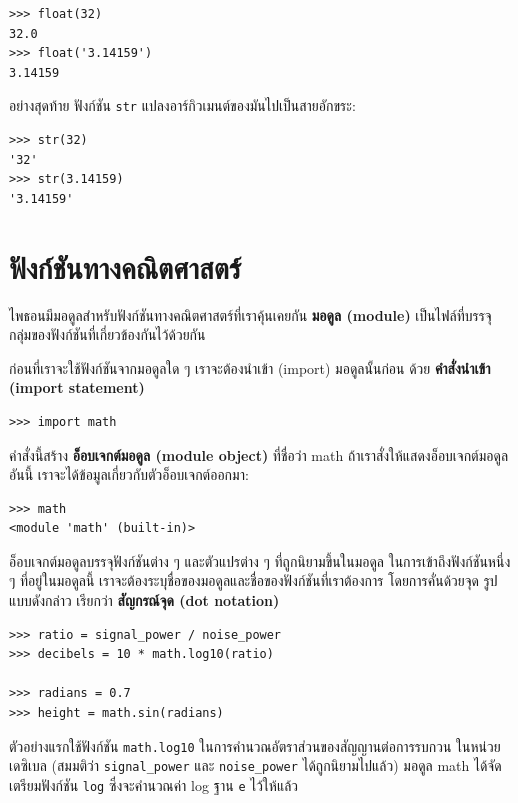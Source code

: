 \begin{verbatim}
>>> float(32)
32.0
>>> float('3.14159')
3.14159
\end{verbatim}
%
อย่างสุดท้าย ฟังก์ชัน {\tt str} แปลงอาร์กิวเมนต์ของมันไปเป็นสายอักขระ:

\begin{verbatim}
>>> str(32)
'32'
>>> str(3.14159)
'3.14159'
\end{verbatim}
%


\section{ฟังก์ชันทางคณิตศาสตร์} %

ไพธอนมีมอดูลสำหรับฟังก์ชันทางคณิตศาสตร์ที่เราคุ้นเคยกัน  {\bf มอดูล (module)} 
เป็นไฟล์ที่บรรจุกลุ่มของฟังก์ชันที่เกี่ยวข้องกันไว้ด้วยกัน

ก่อนที่เราจะใช้ฟังก์ชันจากมอดูลใด ๆ เราจะต้องนำเข้า (import) มอดูลนั้นก่อน ด้วย 
{\bf คำสั่งนำเข้า (import statement)}


\begin{verbatim}
>>> import math
\end{verbatim}
%
คำสั่งนี้สร้าง {\bf อ็อบเจกต์มอดูล (module object)} ที่ชื่อว่า math 
ถ้าเราสั่งให้แสดงอ็อบเจกต์มอดูลอันนี้ เราจะได้ข้อมูลเกี่ยวกับตัวอ็อบเจกต์ออกมา:

\begin{verbatim}
>>> math
<module 'math' (built-in)>
\end{verbatim}
%
อ็อบเจกต์มอดูลบรรจุฟังก์ชันต่าง ๆ และตัวแปรต่าง ๆ ที่ถูกนิยามขึ้นในมอดูล ในการเข้าถึงฟังก์ชันหนึ่ง ๆ
ที่อยู่ในมอดูลนี้ เราจะต้องระบุชื่อของมอดูลและชื่อของฟังก์ชันที่เราต้องการ โดยการคั่นด้วยจุด 
รูปแบบดังกล่าว เรียกว่า {\bf สัญกรณ์จุด (dot notation)}

\begin{verbatim}
>>> ratio = signal_power / noise_power
>>> decibels = 10 * math.log10(ratio)

>>> radians = 0.7
>>> height = math.sin(radians)
\end{verbatim}
%
ตัวอย่างแรกใช้ฟังก์ชัน \verb"math.log10" ในการคำนวณอัตราส่วนของสัญญานต่อการรบกวน 
ในหน่วยเดซิเบล (สมมติว่า \verb|signal_power| และ \verb|noise_power| ได้ถูกนิยามไปแล้ว) 
มอดูล math ได้จัดเตรียมฟังก์ชัน {\tt log} ซึ่งจะคำนวณค่า log ฐาน {\tt e} ไว้ให้แล้ว

